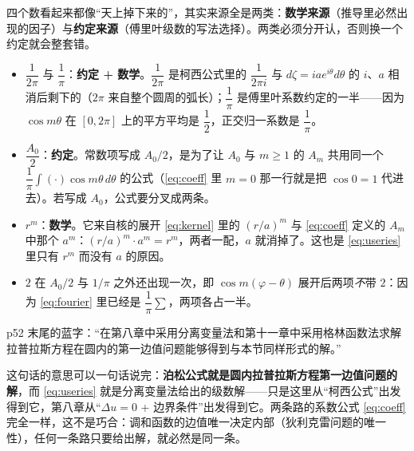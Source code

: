 \documentclass[11pt]{ctexart}
\let\origsubhdr\subhdr
\renewcommand{\subhdr}[1]{\par\needspace{4\baselineskip}\origsubhdr{#1}}
\begin{document}
四个数看起来都像“天上掉下来的”，其实来源全是两类：\textbf{数学来源}（推导里必然出现的因子）与\textbf{约定来源}（傅里叶级数的写法选择）。两类必须分开认，否则换一个约定就会整套错。

\begin{itemize}
\item $\dfrac{1}{2\pi}$ 与 $\dfrac{1}{\pi}$：\textbf{约定 + 数学}。$\dfrac{1}{2\pi}$ 是柯西公式里的 $\dfrac{1}{2\pi i}$ 与 $d\zeta=iae^{i\theta}d\theta$ 的 $i$、$a$ 相消后剩下的（$2\pi$ 来自整个圆周的弧长）；$\dfrac{1}{\pi}$ 是傅里叶系数约定的一半——因为 $\cos m\theta$ 在 $[0,2\pi]$ 上的平方平均是 $\dfrac12$，正交归一系数是 $\dfrac1\pi$。
\item $\dfrac{A_0}{2}$：\textbf{约定}。常数项写成 $A_0/2$，是为了让 $A_0$ 与 $m\ge1$ 的 $A_m$ 共用同一个 $\dfrac1\pi\int(\cdot)\cos m\theta\,d\theta$ 的公式（\eqref{eq:coeff} 里 $m=0$ 那一行就是把 $\cos0=1$ 代进去）。若写成 $A_0$，公式要分叉成两条。
\item $r^{m}$：\textbf{数学}。它来自核的展开 \eqref{eq:kernel} 里的 $(r/a)^{m}$ 与 \eqref{eq:coeff} 定义的 $A_m$ 中那个 $a^{m}$：$(r/a)^{m}\cdot a^{m}=r^{m}$，两者一配，$a$ 就消掉了。这也是 \eqref{eq:useries} 里只有 $r^{m}$ 而没有 $a$ 的原因。
\item $2$ 在 $A_0/2$ 与 $1/\pi$ 之外还出现一次，即 $\cos m(\varphi-\theta)$ 展开后两项\emph{不}带 $2$：因为 \eqref{eq:fourier} 里已经是 $\dfrac{1}{\pi}\sum$，两项各占一半。
\end{itemize}


p52 末尾的蓝字：“在第八章中采用分离变量法和第十一章中采用格林函数法求解拉普拉斯方程在圆内的第一边值问题能够得到与本节同样形式的解。”

这句话的意思可以一句话说完：\textbf{泊松公式就是圆内拉普拉斯方程第一边值问题的解}，而 \eqref{eq:useries} 就是分离变量法给出的级数解——只是这里从“柯西公式”出发得到它，第八章从“$\Delta u=0$ + 边界条件”出发得到它。两条路的系数公式 \eqref{eq:coeff} 完全一样，这不是巧合：调和函数的边值唯一决定内部（狄利克雷问题的唯一性），任何一条路只要给出解，就必然是同一条。


\flowerrule
\end{document}
